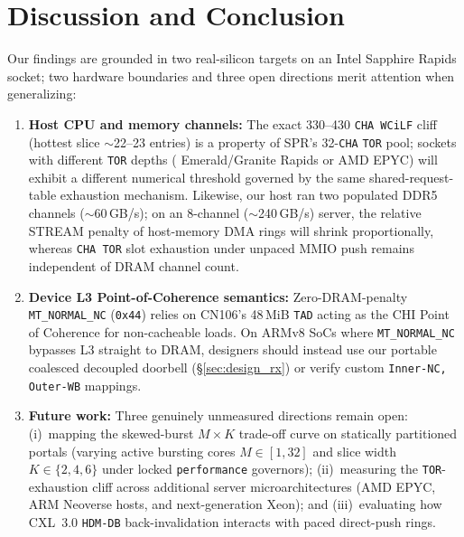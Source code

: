 \section{Discussion and Conclusion}
\label{sec:conclusion}

Our findings are grounded in two real-silicon targets on an Intel Sapphire Rapids socket; two hardware boundaries and three open directions merit attention when generalizing:
\begin{enumerate}
  \item \textbf{Host CPU and memory channels:} The exact 330--430 \texttt{CHA WCiLF} cliff (hottest slice $\sim$22--23 entries) is a property of SPR's 32-\texttt{CHA} \texttt{TOR} pool; sockets with different \texttt{TOR} depths (\eg{} Emerald/Granite Rapids or AMD EPYC) will exhibit a different numerical threshold governed by the same shared-request-table exhaustion mechanism. Likewise, our host ran two populated DDR5 channels ($\sim$60\,GB/s); on an 8-channel ($\sim$240\,GB/s) server, the relative STREAM penalty of host-memory DMA rings will shrink proportionally, whereas \texttt{CHA TOR} slot exhaustion under unpaced MMIO push remains independent of DRAM channel count.
  \item \textbf{Device L3 Point-of-Coherence semantics:} Zero-DRAM-penalty \texttt{MT\_NORMAL\_NC} (\texttt{0x44}) relies on CN106's 48\,MiB \texttt{TAD} acting as the CHI Point of Coherence for non-cacheable loads. On ARMv8 SoCs where \texttt{MT\_NORMAL\_NC} bypasses L3 straight to DRAM, designers should instead use our portable coalesced decoupled doorbell (\S\ref{sec:design_rx}) or verify custom \texttt{Inner-NC, Outer-WB} mappings.
  \item \textbf{Future work:} Three genuinely unmeasured directions remain open: (i)~mapping the skewed-burst $M \times K$ trade-off curve on statically partitioned portals (varying active bursting cores $M \in [1, 32]$ and slice width $K \in \{2, 4, 6\}$ under locked \texttt{performance} governors); (ii)~measuring the \texttt{TOR}-exhaustion cliff across additional server microarchitectures (AMD EPYC, ARM Neoverse hosts, and next-generation Xeon); and (iii)~evaluating how CXL~3.0 \texttt{HDM-DB} back-invalidation interacts with paced direct-push rings.
\end{enumerate}


